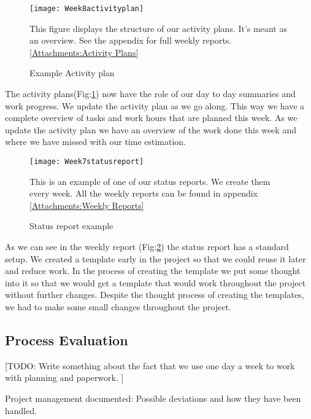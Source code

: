     \begin{figure}[H]
        \centering
        \texttt{[image: Week8activityplan]}
        \caption{Example Activity plan}
        This figure displays the structure of our activity plans. It's meant as an overview. See the appendix for full weekly reports. 
        \ref{Attachments:Activity Plans}
        \label{fig:Week8activityplan}
    \end{figure}
    
    The activity plans(Fig:\ref{fig:Week8activityplan}) now have the role of our day to day summaries and work progress. We update the activity plan as we go along. This way we have a complete overview of tasks and work hours that are planned this week. As we update the activity plan we have an overview of the work done this week and where we have missed with our time estimation. 
    
    \begin{figure}[H]
        \centering
        \texttt{[image: Week7statusreport]}
        \caption{Status report example}
        This is an example of one of our status reports. We create them every week. All the weekly reports can be found in appendix \ref{Attachments:Weekly Reports}
        \label{fig:Week7statusreport}
    \end{figure}
    
    As we can see in the weekly report (Fig:\ref{fig:Week7statusreport}) the status report has a standard setup. We created a template early in the project so that we could reuse it later and reduce work. In the process of creating the template we put some thought into it so that we would get a template that would work throughout the project without further changes. Despite the thought process of creating the templates, we had to make some small changes throughout the project.
    
       \subsection{Process Evaluation}\label{Process Evaluation}
    [TODO: Write something about the fact that we use one day a week to work with planning and paperwork. ]
    
    Project management documented: 
    Possible deviations and how they have
been handled. 
